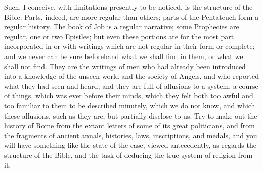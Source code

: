 Such, I conceive, with limitations presently to be noticed, is the
structure of the Bible. Parts, indeed, are more regular than others;
parts of the Pentateuch form a regular history. The book of Job is a
regular narrative; some Prophecies are regular, one or two Epistles;
but even these portions are for the most part incorporated in or with
writings which are not regular in their form or complete; and we never
can be sure beforehand what we shall find in them, or what we shall
not find. They are the writings of men who had already been introduced
into a knowledge of the unseen world and the society of Angels, and
who reported what they had seen and heard; and they are full of
allusions to a system, a course of things, which was ever before their
minds, which they felt both too awful and too familiar to them to be
described minutely, which we do not know, and which these allusions,
such as they are, but partially disclose to us. Try to make out
the history of Rome from the extant letters of some of its great
politicians, and from the fragments of ancient annals, histories,
laws, inscriptions, and medals, and you will have something like the
state of the case, viewed antecedently, as regards the structure of
the Bible, and the task of deducing the true system of religion from
it.

